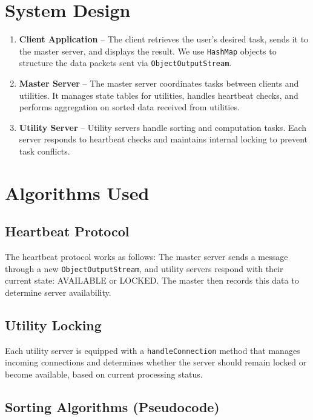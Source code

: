 \documentclass{article}
\begin{document}
	\section{System Design}
	\begin{enumerate}
		\item \textbf{Client Application} – The client retrieves the user's desired task, sends it to the master server, and displays the result. We use \texttt{HashMap} objects to structure the data packets sent via \texttt{ObjectOutputStream}.
		
		\item \textbf{Master Server} – The master server coordinates tasks between clients and utilities. It manages state tables for utilities, handles heartbeat checks, and performs aggregation on sorted data received from utilities.
		
		\item \textbf{Utility Server} – Utility servers handle sorting and computation tasks. Each server responds to heartbeat checks and maintains internal locking to prevent task conflicts.
	\end{enumerate}
	
	\section{Algorithms Used}    
	\subsection{Heartbeat Protocol}
	The heartbeat protocol works as follows: The master server sends a message through a new \texttt{ObjectOutputStream}, and utility servers respond with their current state: AVAILABLE or LOCKED. The master then records this data to determine server availability.
	
	\subsection{Utility Locking}
	Each utility server is equipped with a \texttt{handleConnection} method that manages incoming connections and determines whether the server should remain locked or become available, based on current processing status.
	
	\subsection{Sorting Algorithms (Pseudocode)}
	
\end{document}
